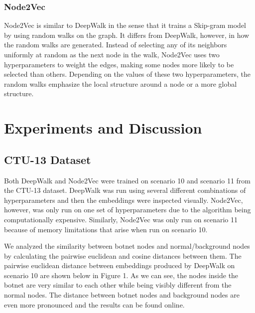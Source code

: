 \documentclass[10pt]{article}
\begin{document}
\begin{multicols}{2}
\subsubsection{Node2Vec}
Node2Vec \cite{Grover} is similar to DeepWalk in the sense that it trains a Skip-gram model by using random walks on the graph. It differs from DeepWalk, however, in how the random walks are generated. Instead of selecting any of its neighbors uniformly at random as the next node in the walk, Node2Vec uses two hyperparameters to weight the edges, making some nodes more likely to be selected than others. Depending on the values of these two hyperparameters, the random walks emphasize the local structure around a node or a more global structure. 

\section{Experiments and Discussion}
\subsection{CTU-13 Dataset}

Both DeepWalk and Node2Vec were trained on scenario 10 and scenario 11 from the CTU-13 dataset. DeepWalk was run using several different combinations of hyperparameters and then the embeddings were inspected visually. Node2Vec, however, was only run on one set of hyperparameters due to the algorithm being computationally expensive. Similarly, Node2Vec was only run on scenario 11 because of memory limitations  that arise when run on scenario 10.

We analyzed the similarity between botnet nodes and normal/background nodes by calculating the pairwise euclidean and cosine distances between them. The pairwise euclidean distance between embeddings produced by DeepWalk on scenario 10  are shown below in Figure 1. As we can see, the nodes inside the botnet are very similar to each other while being visibly different from the normal nodes. The distance between botnet nodes and background nodes are even more pronounced and the results can be found online.



\end{multicols}
\end{document}
